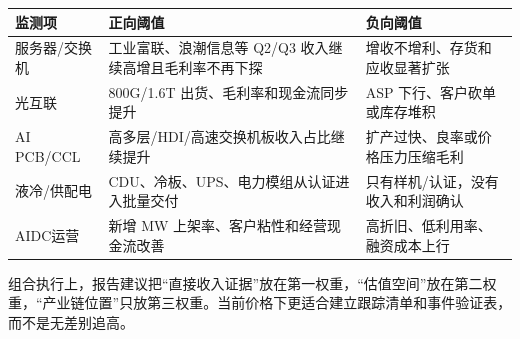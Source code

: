 \begin{exhibitbox}[催化剂与监测阈值]
\begin{tabularx}{\textwidth}{L{3.0cm}X X}
\toprule
\textbf{监测项} & \textbf{正向阈值} & \textbf{负向阈值}\\
\midrule
服务器/交换机 & 工业富联、浪潮信息等 Q2/Q3 收入继续高增且毛利率不再下探 & 增收不增利、存货和应收显著扩张\\
光互联 & 800G/1.6T 出货、毛利率和现金流同步提升 & ASP 下行、客户砍单或库存堆积\\
AI PCB/CCL & 高多层/HDI/高速交换机板收入占比继续提升 & 扩产过快、良率或价格压力压缩毛利\\
液冷/供配电 & CDU、冷板、UPS、电力模组从认证进入批量交付 & 只有样机/认证，没有收入和利润确认\\
AIDC运营 & 新增 MW 上架率、客户粘性和经营现金流改善 & 高折旧、低利用率、融资成本上行\\
\bottomrule
\end{tabularx}
\end{exhibitbox}

组合执行上，报告建议把“直接收入证据”放在第一权重，“估值空间”放在第二权重，“产业链位置”只放第三权重。当前价格下更适合建立跟踪清单和事件验证表，而不是无差别追高。
